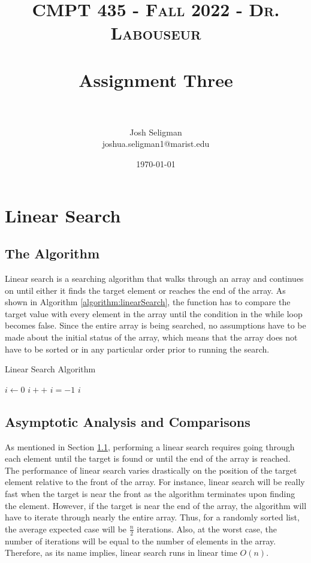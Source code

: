 \documentclass[letterpaper, 10pt,DIV=13]{scrartcl}
\title{	
   \normalfont \normalsize 
   \textsc{CMPT 435 - Fall 2022 - Dr. Labouseur} \\[10pt] %
   \horrule{0.5pt} \\[0.25cm] 	%
   \huge Assignment Three  \\     	    %
   \horrule{0.5pt} \\[0.25cm] 	%
}
\author{Josh Seligman \\ \normalsize joshua.seligman1@marist.edu}
\date{\normalsize\today} 	%
\numberwithin{equation}{section} %
\numberwithin{figure}{section} %
\numberwithin{table}{section} %
\begin{document}
\maketitle %

\section{Linear Search}
\subsection{The Algorithm}\label{linearSearch}
Linear search is a searching algorithm that walks through an array and continues on until either it finds the target element or reaches the end of the array. As shown in Algorithm \ref{algorithm:linearSearch}, the function has to compare the target value with every element in the array until the condition in the while loop becomes false. Since the entire array is being searched, no assumptions have to be made about the initial status of the array, which means that the array does not have to be sorted or in any particular order prior to running the search.

\begin{algorithm}
  \caption{Linear Search Algorithm}
  \label{algorithm:linearSearch}
  \begin{algorithmic}[1]
        \State $i \gets 0$ 
         
          \State $i++$
        \EndWhile
          \State $i = -1$ 
        \EndIf
        \State \Return $i$
      \EndProcedure
  \end{algorithmic}
\end{algorithm}

\subsection{Asymptotic Analysis and Comparisons}
As mentioned in Section \ref{linearSearch}, performing a linear search requires going through each element until the target is found or until the end of the array is reached. The performance of linear search varies drastically on the position of the target element relative to the front of the array. For instance, linear search will be really fast when the target is near the front as the algorithm terminates upon finding the element. However, if the target is near the end of the array, the algorithm will have to iterate through nearly the entire array. Thus, for a randomly sorted list, the average expected case will be $\frac{n}{2}$ iterations. Also, at the worst case, the number of iterations will be equal to the number of elements in the array. Therefore, as its name implies, linear search runs in linear time $O(n)$.
\end{document}
